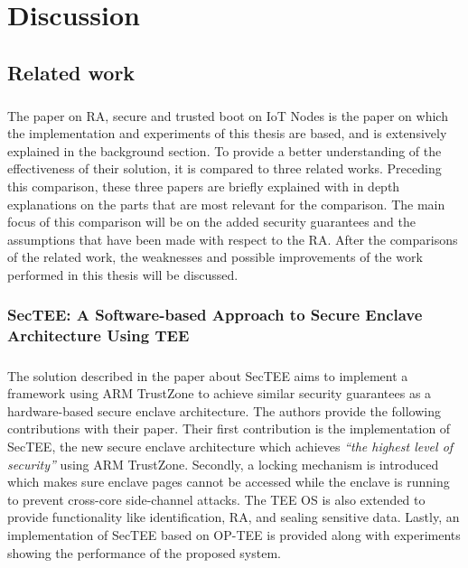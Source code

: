 \chapter{Discussion}

\section{Related work}

\paragraph*{}
The paper on RA, secure and trusted boot on IoT Nodes \cite{LingZhen2021Sbtb} is the paper on which the implementation and experiments of this thesis are based, and is extensively explained in the background section. To provide a better understanding of the effectiveness of their solution, it is compared to three related works. Preceding this comparison, these three papers are briefly explained with in depth explanations on the parts that are most relevant for the comparison. The main focus of this comparison will be on the added security guarantees and the assumptions that have been made with respect to the RA. After the comparisons of the related work, the weaknesses and possible improvements of the work performed in this thesis will be discussed.

\subsection*{SecTEE: A Software-based Approach to Secure Enclave Architecture Using TEE}

\paragraph*{}
The solution described in the paper about SecTEE \cite{ZhaoShijun2019SASA} aims to implement a framework using ARM TrustZone to achieve similar security guarantees as a hardware-based secure enclave architecture. The authors provide the following contributions with their paper. Their first contribution is the implementation of SecTEE, the new secure enclave architecture which achieves \textit{\enquote{the highest level of security}} using ARM TrustZone. Secondly, a locking mechanism is introduced which makes sure enclave pages cannot be accessed while the enclave is running to prevent cross-core side-channel attacks. The TEE OS is also extended to provide functionality like identification, RA, and sealing sensitive data. Lastly, an implementation of SecTEE based on OP-TEE is provided along with experiments showing the performance of the proposed system. 

